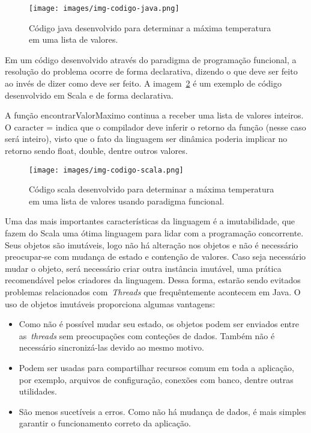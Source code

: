 \begin{figure}
	\centering
	\texttt{[image: images/img-codigo-java.png]}
	\caption{Código java desenvolvido para determinar a máxima temperatura em uma lista de valores.}
	\label{fig:codigo-java}
\end{figure}

Em um código desenvolvido através do paradigma de programação funcional, a resolução do problema ocorre de forma declarativa, dizendo o que deve ser feito ao invés de dizer como deve ser feito. A imagem~\ref{fig:codigo-scala} é um exemplo de código desenvolvido em Scala e de forma declarativa.

A função encontrarValorMaximo continua a receber uma lista de valores inteiros. O caracter = indica que o compilador deve inferir o retorno da função (nesse caso será inteiro), visto que o fato da linguagem ser dinâmica poderia implicar no retorno sendo float, double, dentre outros valores.

\begin{figure}
	\centering
	\texttt{[image: images/img-codigo-scala.png]}
	\caption{Código scala desenvolvido para determinar a máxima temperatura em uma lista de valores usando paradigma funcional.}
	\label{fig:codigo-scala}
\end{figure}

Uma das mais importantes características da linguagem é a imutabilidade, que fazem do Scala uma ótima linguagem para lidar com a programação concorrente. Seus objetos são imutáveis, logo não há alteração nos objetos e não é necessário preocupar-se com mudança de estado e contenção de valores. Caso seja necessário mudar o objeto, será necessário criar outra instância imutável, uma prática recomendável pelos criadores da linguagem. Dessa forma, estarão sendo evitados problemas relacionados com~\emph{Threads} que frequêntemente acontecem em Java. O uso de objetos imutáveis proporciona algumas vantagens:
 \begin{itemize}
	\item Como não é possível mudar seu estado, os objetos podem ser enviados entre as~\emph{threads} sem preocupações com conteções de dados. Também não é necessário sincronizá-las devido ao mesmo motivo.
	\item Podem ser usadas para compartilhar recursos comum em toda a aplicação, por exemplo, arquivos de configuração, conexões com banco, dentre outras utilidades.
	\item São menos sucetíveis a erros. Como não há mudança de dados, é mais simples garantir o funcionamento correto da aplicação.
\end{itemize}


